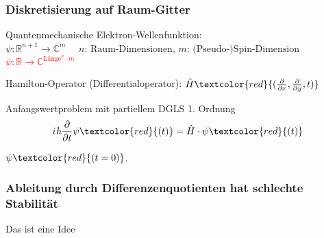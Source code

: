 \documentclass{beamer}
\newcommand{\iu}{{i\mkern1mu}} 	%
\newcommand{\absatz}{\vskip3mm}
\begin{document}
\begin{frame}[t] %
  \frametitle{Diskretisierung auf Raum-Gitter}
 Quantenmechanische Elektron-Wellenfunktion: \\
 \sout{$\psi: \mathbb{R}^{n+1} \rightarrow \mathbb{C}^m$} $ \quad \text{$n$: Raum-Dimensionen, $m$: (Pseudo-)Spin-Dimension}$
 \\
\textcolor{red}{$\psi: \mathbb{R} \rightarrow \mathbb{C}^{\text{Länge}^n\cdot m} $}

 \absatz
 Hamilton-Operator (Differentialoperator): $\hat{H}\textcolor{red}{(\frac{\partial}{\partial x}, \frac{\partial}{\partial y}, t)}$

 \begin{block}{Anfangswertproblem mit partiellem DGLS 1. Ordnung}
  \begin{equation*}
    \iu \hbar \frac{\partial}{\partial t}  \psi\textcolor{red}{(t)} = \hat{H} \cdot \psi\textcolor{red}{(t)} 
  \end{equation*}

    $\psi\textcolor{red}{(t=0)}$.
    \end{block}
\end{frame}

\begin{frame}[t] 
  \frametitle{Ableitung durch Differenzenquotienten hat schlechte Stabilität}
Das ist eine Idee
\end{frame}




\end{document}
